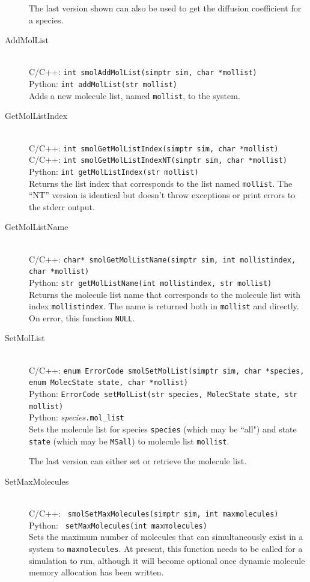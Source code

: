 \documentclass {book}
\newcommand {\ttt} {\texttt}
\begin{document}
\begin{description}
The last version shown can also be used to get the diffusion coefficient for a species.


\item[AddMolList]
\hfill \\
C/C++: \ttt{int smolAddMolList(simptr sim, char *mollist)}\\
Python: \ttt{int addMolList(str mollist)}\\
Adds a new molecule list, named \ttt{mollist}, to the system.

\item[GetMolListIndex]
\hfill \\
C/C++: \ttt{int smolGetMolListIndex(simptr sim, char *mollist)}\\
C/C++: \ttt{int smolGetMolListIndexNT(simptr sim, char *mollist)}\\
Python: \ttt{int getMolListIndex(str mollist)}\\
Returns the list index that corresponds to the list named \ttt{mollist}. The ``NT'' version is identical but doesn't throw exceptions or print errors to the stderr output.

\item[GetMolListName]
\hfill \\
C/C++: \ttt{char* smolGetMolListName(simptr sim, int mollistindex, char *mollist)}\\
Python: \ttt{str getMolListName(int mollistindex, str mollist)}\\
Returns the molecule list name that corresponds to the molecule list with index \ttt{mollistindex}. The name is returned both in \ttt{mollist} and directly. On error, this function \ttt{NULL}.

\item[SetMolList]
\hfill \\
C/C++: \ttt{enum ErrorCode smolSetMolList(simptr sim, char *species, enum MolecState state, char *mollist)}\\
Python: \ttt{ErrorCode setMolList(str species, MolecState state, str mollist)}\\
Python: \textit{species}\ttt{.mol\_list}\\
Sets the molecule list for species \ttt{species} (which may be ``all") and state \ttt{state} (which may be \ttt{MSall}) to molecule list \ttt{mollist}.

The last version can either set or retrieve the molecule list.

\item[SetMaxMolecules]
\hfill \\
C/C++: \ttt{ smolSetMaxMolecules(simptr sim, int maxmolecules)}\\
Python: \ttt{ setMaxMolecules(int maxmolecules)}\\
Sets the maximum number of molecules that can simultaneously exist in a system to \ttt{maxmolecules}. At present, this function needs to be called for a simulation to run, although it will become optional once dynamic molecule memory allocation has been written.


\end{description}
\end{document}
